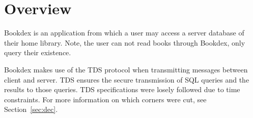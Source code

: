 \documentclass[../design_doc.tex]{subfiles}
\begin{document}
\section{Overview}\label{sec:overview}
    Bookdex is an application from which a user may access a server database of their home library. Note, the user can not read books through Bookdex, only query their existence.

    Bookdex makes use of the TDS protocol when transmitting messages between client and server. TDS ensures the secure transmission of SQL queries and the results to those queries. TDS specifications were losely followed due to time constraints. For more information on which corners were cut, see Section~\ref{sec:dec}.
    
\end{document}
